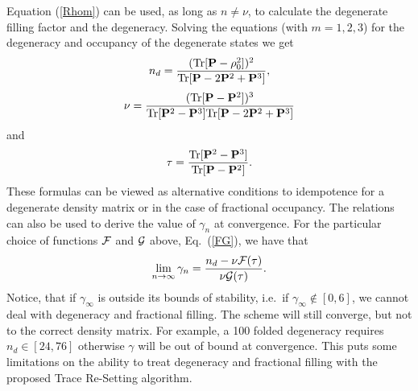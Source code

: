 \commentoutA{\documentclass[prb,aps,twocolumn,twocolumngrid,secnumarabic]{revtex4}}
\begin{document}
Equation (\ref{Rhom}) can be used, as long as
$n \neq \nu$, to calculate the degenerate filling factor and the degeneracy.
Solving the equations (with $m=1,2,3$) for the degeneracy and occupancy
of the degenerate states we get
\begin{equation}
n_d = \frac{({\rm Tr} [{\bf P}-\rho_0^2 ])^2}{{\rm Tr} [{\bf P}-2{\bf P}^2+{\bf P}^3 ]},
\end{equation}
\begin{equation}
\nu = \frac{({\rm Tr} [{\bf P}-{\bf P}^2 ])^3}{{\rm Tr} [{\bf P}^2-{\bf P}^3 ]
{\rm Tr} [{\bf P}-2{\bf P}^2+{\bf P}^3 ]}
\end{equation}
and
\begin{equation}
\tau = \frac{{\rm Tr} [{\bf P}^2-{\bf P}^3 ]}{{\rm Tr} [{\bf P}-{\bf P}^2 ]}.
\end{equation}
These formulas can be viewed as alternative conditions to idempotence
for a degenerate density matrix or in the case of fractional occupancy. 
The relations can also be used
to derive the value of $\gamma_n$ at convergence. For the particular
choice of functions $\cal F$ and $\cal G$ above, Eq.\ (\ref{FG}), we have that
\begin{equation}
\lim_{n \rightarrow \infty} \gamma_n = \frac{n_d - \nu {\cal F}(\tau )}
                                               {\nu {\cal G}(\tau )}.
\end{equation}
Notice, that if $\gamma_{\infty}$
is outside its bounds of stability, i.e.\ if $\gamma_{\infty} \notin [0,6]$, we cannot deal with
degeneracy and fractional filling. The scheme will still
converge, but not to the correct density matrix. For example,
a 100 folded degeneracy requires $n_d \in [24,76]$ otherwise
$\gamma$ will be out of bound at convergence. This puts some
limitations on the ability to treat degeneracy and fractional filling
with the proposed Trace Re-Setting algorithm.



\end{document}
